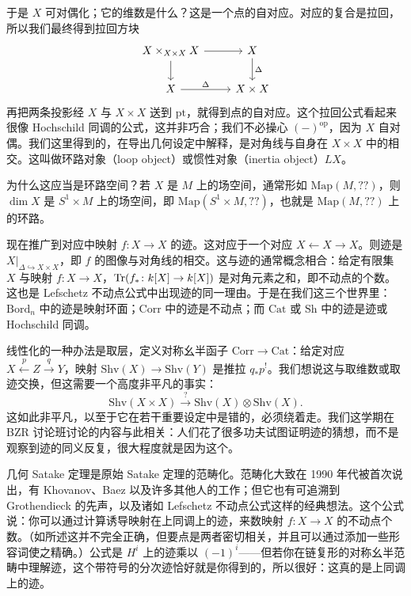 于是 $X$ 可对偶化；它的维数是什么？这是一个点的自对应。对应的复合是拉回，所以我们最终得到拉回方块
\[
\begin{tikzcd}
X\times_{X\times X}X \arrow[r] \arrow[d] & X \arrow[d, "\Delta"] \\
X \arrow[r, "\Delta" ] & X\times X
\end{tikzcd}
\]
再把两条投影经 $X$ 与 $X\times X$ 送到 $\mathrm{pt}$，就得到点的自对应。这个拉回公式看起来很像 Hochschild 同调的公式，这并非巧合；我们不必操心 $(-)^{\mathrm{op}}$，因为 $X$ 自对偶。我们这里得到的，在导出几何设定中解释，是对角线与自身在 $X\times X$ 中的相交。这叫做环路对象（loop object）或惯性对象（inertia object）$LX$。

为什么这应当是环路空间？若 $X$ 是 $M$ 上的场空间，通常形如 $\mathrm{Map}(M,??)$，则 $\dim X$ 是 $S^1\times M$ 上的场空间，即 $\mathrm{Map}(S^1\times M,??)$，也就是 $\mathrm{Map}(M,??)$ 上的环路。


现在推广到对应中映射 $f\colon X\to X$ 的迹。这对应于一个对应 $X\leftarrow X\to X$。则迹是 $X|_{\Delta\hookrightarrow X\times X}$，即 $f$ 的图像与对角线的相交。这与迹的通常概念相合：给定有限集 $X$ 与映射 $f\colon X\to X$，$\operatorname{Tr}(f_*\colon k[X]\to k[X])$ 是对角元素之和，即不动点的个数。这也是 Lefschetz 不动点公式中出现迹的同一理由。于是在我们这三个世界里：$\mathrm{Bord}_n$ 中的迹是映射环面；$\mathrm{Corr}$ 中的迹是不动点；而 $\mathrm{Cat}$ 或 $\mathrm{Sh}$ 中的迹是迹或 Hochschild 同调。

线性化的一种办法是取层，定义对称幺半函子 $\mathrm{Corr}\to\mathrm{Cat}$：给定对应 $X\xleftarrow{p}Z\xrightarrow{q}Y$，映射 $\mathrm{Shv}(X)\to\mathrm{Shv}(Y)$ 是推拉 $q_*p^!$。我们想说这与取维数或取迹交换，但这需要一个高度非平凡的事实：
\[
\mathrm{Shv}(X\times X)\xrightarrow{\ ?\ }\mathrm{Shv}(X)\otimes\mathrm{Shv}(X).
\]
这如此非平凡，以至于它在若干重要设定中是错的，必须绕着走。我们这学期在 BZR 讨论班讨论的内容与此相关：人们花了很多功夫试图证明迹的猜想，而不是观察到迹的同义反复，很大程度就是因为这个。

几何 Satake 定理是原始 Satake 定理的范畴化。范畴化大致在 1990 年代被首次说出，有 Khovanov、Baez 以及许多其他人的工作；但它也有可追溯到 Grothendieck 的先声，以及诸如 Lefschetz 不动点公式这样的经典想法。这个公式说：你可以通过计算诱导映射在上同调上的迹，来数映射 $f\colon X\to X$ 的不动点个数。（如所述这并不完全正确，但要点是两者密切相关，并且可以通过添加一些形容词使之精确。）公式是 $H^i$ 上的迹乘以 $(-1)^i$——但若你在链复形的对称幺半范畴中理解迹，这个带符号的分次迹恰好就是你得到的，所以很好：这真的是上同调上的迹。

